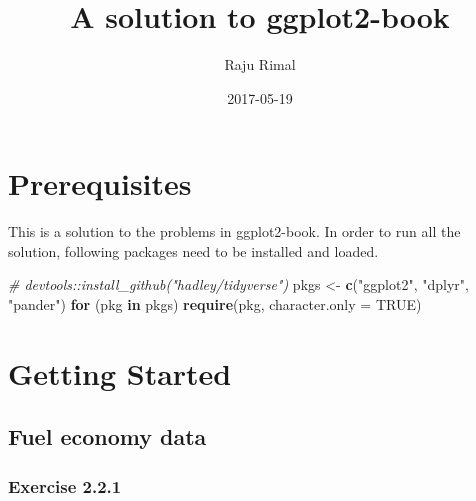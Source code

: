 \documentclass[]{book}
\title{A solution to ggplot2-book}
\author{Raju Rimal}
\date{2017-05-19}
\newenvironment{Shaded}{\begin{snugshade}}{\end{snugshade}}
\newcommand{\KeywordTok}[1]{\textcolor[rgb]{0.13,0.29,0.53}{\textbf{#1}}}
\newcommand{\DataTypeTok}[1]{\textcolor[rgb]{0.13,0.29,0.53}{#1}}
\newcommand{\StringTok}[1]{\textcolor[rgb]{0.31,0.60,0.02}{#1}}
\newcommand{\CommentTok}[1]{\textcolor[rgb]{0.56,0.35,0.01}{\textit{#1}}}
\newcommand{\OtherTok}[1]{\textcolor[rgb]{0.56,0.35,0.01}{#1}}
\newcommand{\ControlFlowTok}[1]{\textcolor[rgb]{0.13,0.29,0.53}{\textbf{#1}}}
\newcommand{\NormalTok}[1]{#1}
\begin{document}
\maketitle

{
\hypersetup{linkcolor=black}
\setcounter{tocdepth}{1}
\tableofcontents
}
\chapter*{Prerequisites}\label{prerequisites}

This is a solution to the problems in ggplot2-book. In order to run all
the solution, following packages need to be installed and loaded.

\begin{Shaded}
\begin{Highlighting}[]
\CommentTok{# devtools::install_github("hadley/tidyverse")}
\NormalTok{pkgs <-}\StringTok{ }\KeywordTok{c}\NormalTok{(}\StringTok{"ggplot2"}\NormalTok{, }\StringTok{"dplyr"}\NormalTok{, }\StringTok{"pander"}\NormalTok{)}
\ControlFlowTok{for}\NormalTok{ (pkg }\ControlFlowTok{in}\NormalTok{ pkgs) }\KeywordTok{require}\NormalTok{(pkg, }\DataTypeTok{character.only =} \OtherTok{TRUE}\NormalTok{)}
\end{Highlighting}
\end{Shaded}

\chapter{Getting Started}\label{getting-started}

\section{Fuel economy data}\label{fuel-economy-data}

\subsection{Exercise 2.2.1}\label{exercise-2.2.1}
\end{document}
